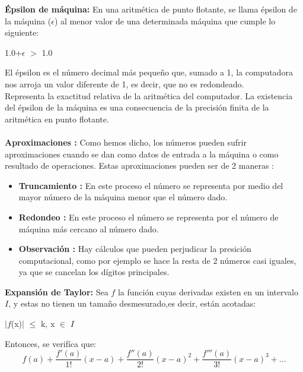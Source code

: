 \documentclass[10pt,a4paper]{article}
\begin{document}
\begin{multicols}{2}
\textbf{\'Epsilon de m\'aquina:}
En una aritm\'etica de punto flotante, se llama \'epsilon de la m\'aquina ($\epsilon$) al menor valor de una determinada máquina que cumple lo siguiente:
\begin{center}
1.0+$\epsilon$ $>$ 1.0
\end{center}
El \'epsilon es el n\'umero decimal más peque\~no que, sumado a 1, la computadora nos arroja un valor diferente de 1, es decir, que no es redondeado.\\
Representa la exactitud relativa de la aritmética del computador. La existencia del \'epsilon de la máquina es una consecuencia de la precisi\'on finita de la aritm\'etica en punto flotante.\\\\
\textbf{Aproximaciones :} 
Como hemos dicho, los n\'umeros pueden sufrir aproximaciones cuando se dan como datos de entrada a la m\'aquina o como resultado de operaciones. Estas aproximaciones pueden ser de 2 maneras :
\begin{itemize}
\item \textbf{Truncamiento :} En este proceso el n\'umero se representa por medio del mayor n\'umero de la m\'aquina menor que el n\'umero dado.
\item \textbf{Redondeo :} En este proceso el n\'umero se representa por el n\'umero de m\'aquina m\'as cercano al n\'umero dado.
\item \textbf{Observaci\'on :} Hay c\'alculos que pueden perjudicar la presici\'on computacional, como por ejemplo se hace la resta de 2 n\'umeros casi iguales, ya que se cancelan los d\'igitos principales.
\end{itemize} 
\textbf{Expansi\'on de Taylor:}
Sea $f$ la funci\'on  cuyas derivadas existen en un intervalo $I$, y estas no tienen un tama\~no desmesurado,es decir, est\'an acotadas:
\begin{center}
$|$\(f\)(x)$|$ $\leq$ k,   x \(\in\) $I$
\end{center}
Entonces, se verif\'ica que:\\
\begin{equation}
{f(a)}+\frac{f'(a)}{1!}{(x-a)}+\frac{f''(a)}{2!}{(x-a)^2}+\frac{f'''(a)}{3!}{(x-a)^3}+...
\end{equation}


\end{multicols}
\end{document}
